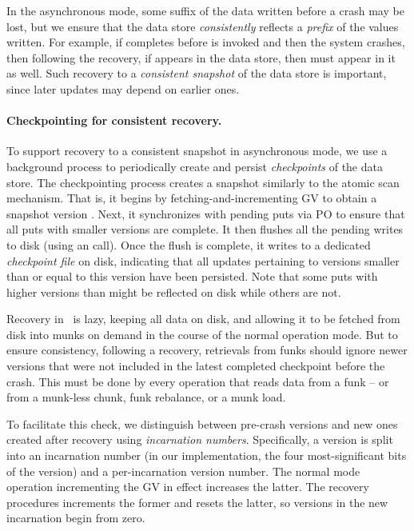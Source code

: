 In the asynchronous mode, some suffix of the  data written before a crash may be lost, but we  
ensure that the data store \emph{consistently} reflects a \emph{prefix} of the  values written.
For example, if  completes before  
is invoked and then the system crashes, then following the recovery, 
if  appears in the data store, then  must appear in it as well. 
Such recovery to a \emph{consistent snapshot} of the data store is important, since later updates may depend on earlier ones. 

\paragraph{Checkpointing for consistent recovery.}

To support recovery to a consistent snapshot in asynchronous mode, we use a background process to
periodically create and persist \emph{checkpoints} of the data store.
The checkpointing process creates a snapshot similarly to the atomic scan mechanism. That is, 
it begins by fetching-and-incrementing GV to obtain a 
 snapshot version .  Next, 
it synchronizes with pending puts via PO to ensure that all puts with smaller versions are complete. 
It then flushes all the pending writes to disk (using an  call). 
Once the flush is complete, it writes  to a dedicated \emph{checkpoint file} on disk,
indicating that all updates pertaining to versions smaller than or equal to this version have been persisted.
Note that some puts with higher versions than  might be reflected on disk while others are not. 

Recovery in \sys\ is lazy, keeping all data on disk, and 
allowing it to be fetched from disk into munks  on demand in the course of the normal operation mode. 
But to ensure consistency, following a recovery,  
retrievals from funks should ignore newer versions that were not included in the latest completed checkpoint before the crash. This must be done by every operation that reads data from a funk --  or  from a munk-less chunk, funk rebalance,  or a munk load. 

To facilitate this check, 
we distinguish between pre-crash versions and new ones created after recovery using \emph{incarnation numbers}. Specifically, a version is split into an incarnation number (in our implementation, the four most-significant bits of the version) and a per-incarnation version number. The normal mode operation incrementing the GV in effect increases the latter. The recovery procedures increments the former and resets the latter, so 
versions in the new incarnation begin from zero. 

